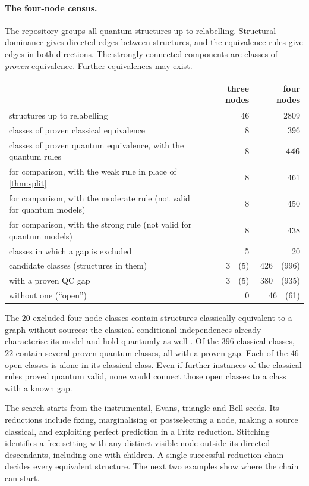 \paragraph{The four-node census.}\label{sec:census}
The repository groups all-quantum structures up to relabelling. Structural dominance gives directed
edges between structures, and the equivalence rules give edges in both directions. The strongly
connected components are classes of \emph{proven} equivalence. Further equivalences may exist.

\begin{center}
\small
\renewcommand{\arraystretch}{1.2}
\begin{tabular}{@{}lrr@{}}
\toprule
 & three nodes & four nodes\\
\midrule
structures up to relabelling & 46 & 2809\\
classes of proven classical equivalence & 8 & 396\\
classes of proven quantum equivalence, with the quantum rules & 8 & \textbf{446}\\
\quad for comparison, with the weak rule in place of \cref{thm:split} & 8 & 461\\
\quad for comparison, with the moderate rule (not valid for quantum models) & 8 & 450\\
\quad for comparison, with the strong rule (not valid for quantum models) & 8 & 438\\
classes in which a gap is excluded & 5 & 20\\
candidate classes (structures in them) & 3\ \ (5) & 426\ \ (996)\\
\quad with a proven QC gap & 3\ \ (5) & 380\ \ (935)\\
\quad without one (``open'') & 0 & 46\ \ (61)\\
\bottomrule
\end{tabular}
\end{center}

The $20$ excluded four-node classes contain structures classically equivalent to a graph without
sources: the classical conditional independences already characterise its model and hold quantumly
as well \cite{HLP}. Of the $396$ classical classes, $22$ contain several proven quantum classes, all
with a proven gap. Each of the $46$ open classes is alone in its classical class. Even if further instances of the classical
rules proved quantum valid, none would connect those open classes to a class with a known gap.

The search starts from the instrumental, Evans, triangle and Bell seeds. Its reductions include fixing,
marginalising or postselecting a node, making a source classical, and exploiting perfect prediction in
a Fritz reduction. Stitching identifies a free setting with any distinct visible node outside its directed
descendants, including one with children. A single successful reduction chain decides every equivalent structure.
The next two examples show where the chain can start.

